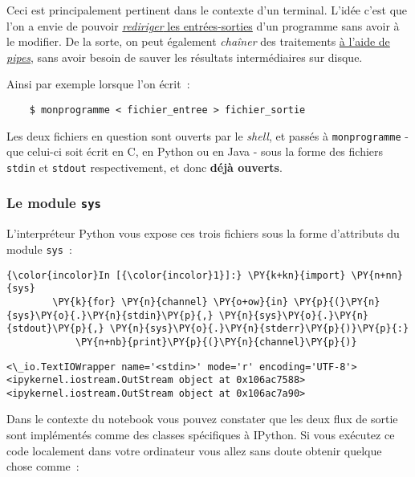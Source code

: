 Ceci est principalement pertinent dans le contexte d'un terminal. L'idée
c'est que l'on a envie de pouvoir
\href{http://en.wikipedia.org/wiki/Redirection_\%28computing\%29}{\emph{rediriger}
les entrées-sorties} d'un programme sans avoir à le modifier. De la
sorte, on peut également \emph{chaîner} des traitements
\href{http://en.wikipedia.org/wiki/Redirection_\%28computing\%29\#Piping}{à
l'aide de \emph{pipes}}, sans avoir besoin de sauver les résultats
intermédiaires sur disque.

    Ainsi par exemple lorsque l'on écrit~:

\begin{verbatim}
    $ monprogramme < fichier_entree > fichier_sortie
\end{verbatim}

Les deux fichiers en question sont ouverts par le \emph{shell}, et
passés à \texttt{monprogramme} - que celui-ci soit écrit en C, en Python
ou en Java - sous la forme des fichiers \texttt{stdin} et
\texttt{stdout} respectivement, et donc \textbf{déjà ouverts}.

    \hypertarget{le-module-sys}{%
\subsubsection{\texorpdfstring{Le module
\texttt{sys}}{Le module sys}}\label{le-module-sys}}

    L'interpréteur Python vous expose ces trois fichiers sous la forme
d'attributs du module \texttt{sys}~:

    \begin{Verbatim}[commandchars=\\\{\}]
{\color{incolor}In [{\color{incolor}1}]:} \PY{k+kn}{import} \PY{n+nn}{sys}
        \PY{k}{for} \PY{n}{channel} \PY{o+ow}{in} \PY{p}{(}\PY{n}{sys}\PY{o}{.}\PY{n}{stdin}\PY{p}{,} \PY{n}{sys}\PY{o}{.}\PY{n}{stdout}\PY{p}{,} \PY{n}{sys}\PY{o}{.}\PY{n}{stderr}\PY{p}{)}\PY{p}{:}
            \PY{n+nb}{print}\PY{p}{(}\PY{n}{channel}\PY{p}{)}
\end{Verbatim}


    \begin{Verbatim}[commandchars=\\\{\}]
<\_io.TextIOWrapper name='<stdin>' mode='r' encoding='UTF-8'>
<ipykernel.iostream.OutStream object at 0x106ac7588>
<ipykernel.iostream.OutStream object at 0x106ac7a90>

    \end{Verbatim}

    Dans le contexte du notebook vous pouvez constater que les deux flux de
sortie sont implémentés comme des classes spécifiques à IPython. Si vous
exécutez ce code localement dans votre ordinateur vous allez sans doute
obtenir quelque chose comme~:

